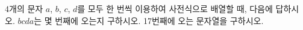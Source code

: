4개의 문자 $a$, $b$, $c$, $d$를 모두 한 번씩 이용하여 사전식으로 배열할 때, 다음에 답하시오.
 $bcda$는 몇 번째에 오는지 구하시오.
 17번째에 오는 문자열을 구하시오.
